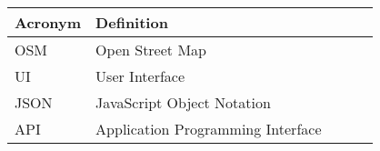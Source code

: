 \begin{table}[H]
\centering
\label{Acronym}
\begin{tabular}{l|llll}
\textbf{Acronym} & \textbf{Definition} &  \\ \hline
OSM         & Open Street Map & \\
UI         & User Interface &  \\
JSON		& JavaScript Object Notation & \\  
API		& Application Programming Interface & \\  
\end{tabular}
\end{table}

